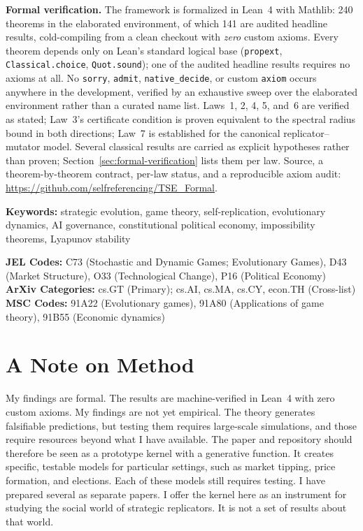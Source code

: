 \documentclass[12pt]{article}
\begin{document}
\noindent\textbf{Formal verification.} The framework is formalized in Lean~4 with Mathlib: 240 theorems in the elaborated environment, of which 141 are audited headline results, cold-compiling from a clean checkout with \emph{zero} custom axioms. Every theorem depends only on Lean's standard logical base (\texttt{propext}, \texttt{Classical.choice}, \texttt{Quot.sound}); one of the audited headline results requires no axioms at all. No \texttt{sorry}, \texttt{admit}, \texttt{native\_decide}, or custom \texttt{axiom} occurs anywhere in the development, verified by an exhaustive sweep over the elaborated environment rather than a curated name list. Laws~1, 2, 4, 5, and~6 are verified as stated; Law~3's certificate condition is proven equivalent to the spectral radius bound in both directions; Law~7 is established for the canonical replicator--mutator model. Several classical results are carried as explicit hypotheses rather than proven; Section~\ref{sec:formal-verification} lists them per law. Source, a theorem-by-theorem contract, per-law status, and a reproducible axiom audit: \url{https://github.com/selfreferencing/TSE_Formal}.

\noindent\textbf{Keywords:} strategic evolution, game theory, self-replication, evolutionary dynamics, AI governance, constitutional political economy, impossibility theorems, Lyapunov stability

\noindent\textbf{JEL Codes:} C73 (Stochastic and Dynamic Games; Evolutionary Games), D43 (Market Structure), O33 (Technological Change), P16 (Political Economy)
\noindent\textbf{ArXiv Categories:} cs.GT (Primary); cs.AI, cs.MA, cs.CY, econ.TH (Cross-list)
\noindent\textbf{MSC Codes:} 91A22 (Evolutionary games), 91A80 (Applications of game theory), 91B55 (Economic dynamics)

\section*{A Note on Method}

My findings are formal. The results are machine-verified in Lean~4 with zero custom axioms. My
findings are not yet empirical. The theory generates falsifiable predictions, but testing them
requires large-scale simulations, and those require resources beyond what I have available. The
paper and repository should therefore be seen as a prototype kernel with a generative function.
It creates specific, testable models for particular settings, such as market tipping, price
formation, and elections. Each of these models still requires testing. I have prepared several as
separate papers. I offer the kernel here as an instrument for studying the social world of
strategic replicators. It is not a set of results about that world.
\end{document}
